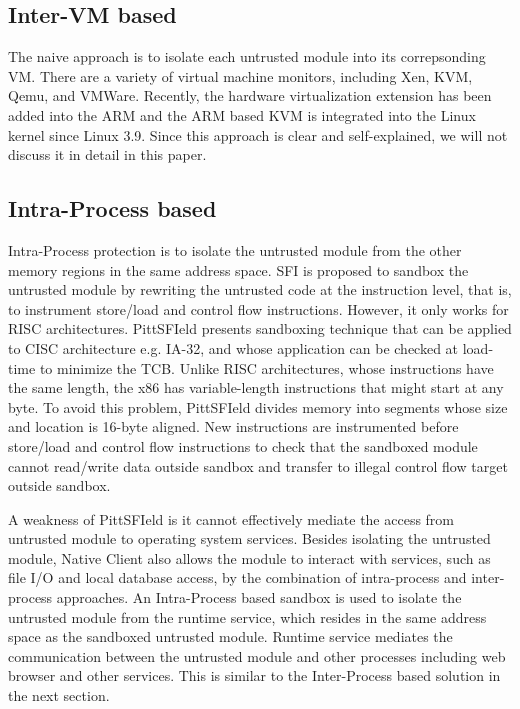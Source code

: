 \subsection{Inter-VM based}

The naive approach is to isolate each untrusted module into its correpsonding
VM. There are a variety of virtual machine monitors, including Xen, KVM, Qemu,
and VMWare.  Recently, the hardware virtualization extension has been added into
the ARM and the ARM based KVM \cite{KVM/ARM} is integrated into the Linux kernel
since Linux 3.9. Since this approach is clear and self-explained, we will not
discuss it in detail in this paper.

\subsection{Intra-Process based}

Intra-Process protection is to isolate the untrusted module from the other
memory regions in the same address space. SFI \cite{SFI} is proposed to sandbox
the untrusted module by rewriting the untrusted code at the instruction level,
that is, to instrument store/load and control flow instructions. However, it
only works for RISC architectures. PittSFIeld \cite{PittSFIeld} presents
sandboxing technique that can be applied to CISC architecture e.g. IA-32, and
whose application can be checked at load-time to minimize the TCB.  Unlike RISC
architectures, whose instructions have the same length, the x86 has
variable-length instructions that might start at any byte. To avoid this
problem, PittSFIeld divides memory into segments whose size and location is
16-byte aligned.  New instructions are instrumented before store/load and
control flow instructions to check that the sandboxed module cannot read/write
data outside sandbox and transfer to illegal control flow target outside
sandbox.

A weakness of PittSFIeld is it cannot effectively mediate the access from
untrusted module to operating system services. Besides isolating the untrusted
module, Native Client \cite{NaCl} also allows the module to interact
with services, such as file I/O and local database access, by the combination of
intra-process and inter-process approaches.  An Intra-Process based sandbox is
used to isolate the untrusted module from the runtime service, which resides in
the same address space as the sandboxed untrusted module. Runtime service
mediates the communication between the untrusted module and other processes
including web browser and other services. This is similar to the Inter-Process
based solution in the next section.

